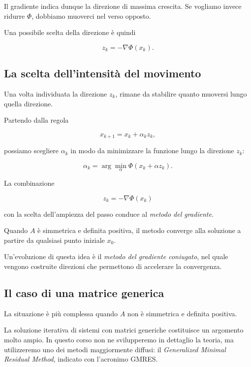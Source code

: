 Il gradiente indica dunque la direzione di massima crescita.
Se vogliamo invece ridurre $\Phi$, dobbiamo muoverci nel verso
opposto.

Una possibile scelta della direzione è quindi

\begin{equation*}
    z_k=-\nabla\Phi(x_k).
    \label{eq:steepest-direction}
\end{equation*}


\subsection{La scelta dell'intensità del movimento}

Una volta individuata la direzione $z_k$, rimane da stabilire
quanto muoversi lungo quella direzione.

Partendo dalla regola

\begin{equation*}
    x_{k+1}=x_k+\alpha_kz_k,
\end{equation*}

possiamo scegliere $\alpha_k$ in modo da minimizzare la funzione
lungo la direzione $z_k$:

\begin{equation*}
    \alpha_k
    =
    \arg\min_{\alpha}
    \Phi(x_k+\alpha z_k).
    \label{eq:line-search}
\end{equation*}

La combinazione

\begin{equation*}
    z_k=-\nabla\Phi(x_k)
\end{equation*}

con la scelta dell'ampiezza del passo conduce al
\emph{metodo del gradiente}.

Quando $A$ è simmetrica e definita positiva, il metodo converge
alla soluzione a partire da qualsiasi punto iniziale $x_0$.

Un'evoluzione di questa idea è il \emph{metodo del gradiente
coniugato}, nel quale vengono costruite direzioni che permettono
di accelerare la convergenza.


\subsection{Il caso di una matrice generica}

La situazione è più complessa quando $A$ non è simmetrica e
definita positiva.

La soluzione iterativa di sistemi con matrici generiche costituisce
un argomento molto ampio. In questo corso non ne svilupperemo in
dettaglio la teoria, ma utilizzeremo uno dei metodi maggiormente
diffusi: il \emph{Generalized Minimal Residual Method}, indicato
con l'acronimo GMRES.


